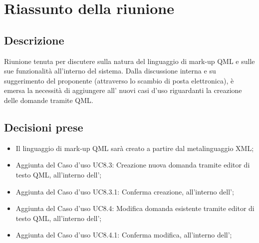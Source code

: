 \section{Riassunto della riunione}
\subsection{Descrizione}

Riunione tenuta per discutere sulla natura del linguaggio di mark-up QML e sulle sue funzionalità all'interno del sistema.
Dalla discussione interna e su suggerimento del proponente (attraverso lo scambio di posta elettronica), è emersa la necessità di aggiungere all'\AdR {} nuovi casi d'uso riguardanti la creazione delle domande tramite QML.

\subsection{Decisioni prese}
\begin{itemize}
\item Il linguaggio di mark-up QML sarà creato a partire dal metalinguaggio XML;
\item Aggiunta del Caso d'uso UC8.3: Creazione nuova domanda tramite editor di testo QML, all'interno dell'\AdR;
\item Aggiunta del Caso d'uso UC8.3.1: Conferma creazione, all'interno dell'\AdR;
\item Aggiunta del Caso d'uso UC8.4: Modifica domanda esistente tramite editor di testo QML, all'interno dell'\AdR;
\item Aggiunta del Caso d'uso UC8.4.1: Conferma modifica, all'interno dell'\AdR;
\end{itemize}
